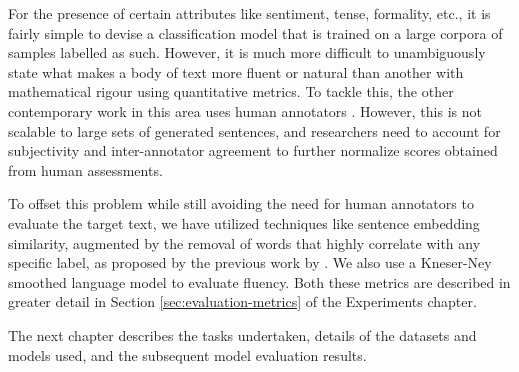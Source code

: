 For the presence of certain attributes like sentiment, tense, formality, etc., it is fairly simple to devise a classification model that is trained on a large corpora of samples labelled as such. However, it is much more difficult to unambiguously state what makes a body of text more fluent or natural than another with mathematical rigour using quantitative metrics. To tackle this, the other contemporary work in this area uses human annotators \cite{hu2017toward,shen2017style,fu2017style}. However, this is not scalable to large sets of generated sentences, and researchers need to account for subjectivity and inter-annotator agreement to further normalize scores obtained from human assessments.

To offset this problem while still avoiding the need for human annotators to evaluate the target text, we have utilized techniques like sentence embedding similarity, augmented by the removal of words that highly correlate with any specific label, as proposed by the previous work by \cite{fu2017style}. We also use a Kneser-Ney smoothed \cite{kneser1995improved} language model to evaluate fluency. Both these metrics are described in greater detail in Section \ref{sec:evaluation-metrics} of the Experiments chapter.


The next chapter describes the tasks undertaken, details of the datasets and models used, and the subsequent model evaluation results.
